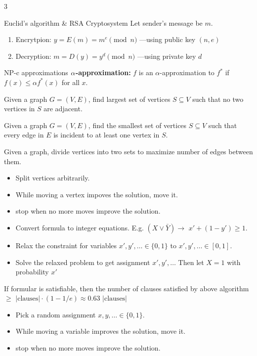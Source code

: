 \documentclass[10pt,a4paper]{article}
\begin{document}
\begin{multicols}{3}
\begin{textbox}{Euclid's algorithm \& RSA Cryptosystem}
     Let sender's message be $m$.
    \begin{enumerate}
        \item Encrytpion: $y = E(m) = m^e \pmod{n}$ —using public key $(n, e)$
        \item Decryption: $m = D(y) = y^{d} \pmod{n}$ —using private key $d$
    \end{enumerate}
\end{textbox}


\begin{textbox}{NP-c approximations}
    {\bf ${\bf \alpha}$-approximation:} $f$ is an $\alpha$-approximation to 
    $f^*$ if $f(x) \leq \alpha f^*(x)$ for all $x$.

     Given a graph $G = (V, E)$, find largest set of 
    vertices $S \subseteq V$ such that no two vertices in $S$ are adjacent.

     Given a graph $G = (V, E)$, find the smallest set of 
    vertices $S \subseteq V$ such that every edge in $E$ is incident to at 
    least one vertex in $S$.

     Given a graph, divide vertices into two sets to maximize 
    number of edges between them.
    \begin{itemize}
        \item Split vertices arbitrarily. 
        \item While moving a vertex impoves the solution, move it.
        \item stop when no more moves improve the solution.
    \end{itemize}
    \begin{itemize}
        \item Convert formula to integer equations. E.g. $(X \vee 
        \bar{Y}) \to$ $x' + (1 - y') \geq 1$.
        \item Relax the constraint for variables $x', y', \dots \in \{0, 1\}$ to 
             $x', y', \dots \in [0, 1]$. 
        \item Solve the relaxed problem to get assignment $x', y', \dots$ 
                Then let $X = 1$ with probability $x'$
    \end{itemize}
     If formular is satisfiable, then the number of clauses satisfied 
    by above algorithm $\geq \text{ |clauses|} \cdot (1 - 1/e) \approx 0.63\text{ |clauses|}$

    \begin{itemize}
        \item Pick a random assignment $x, y, \dots \in \{0, 1\}$.
        \item While moving a variable improves the solution, move it.
        \item stop when no more moves improve the solution.
    \end{itemize}
\end{textbox}



\end{multicols}
\end{document}
